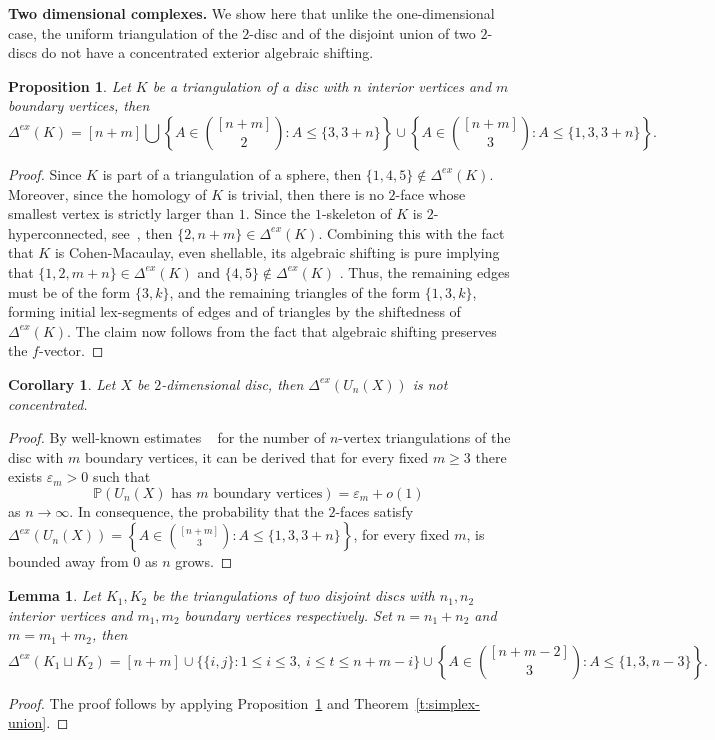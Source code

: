 \documentclass[reqno,english]{amsart}
\newtheorem{lemma}[theorem]{Lemma}
\newtheorem{proposition}[theorem]{Proposition}
\newtheorem{corollary}[theorem]{Corollary}
\numberwithin{claimcounter}{theorem}
\theoremstyle{remark}
\theoremstyle{definition}
\numberwithin{theorem}{section}
\renewcommand{\P}{\mathbb{P}}
\newcommand{\exshift}[1]{\Delta^{ex}(#1)}
\begin{document}
\noindent
{\bf Two dimensional complexes.}
We show here that unlike the one-dimensional case, the uniform triangulation of the $2$-disc and of the disjoint union of two $2$-discs do not have a concentrated exterior algebraic shifting.
\begin{proposition}
    \label{p:discshift}
    Let $K$ be a triangulation of a disc with $n$ interior vertices and $m$ boundary vertices, then $$\exshift{K} = [n+m] \bigcup \left \{A\in \binom{[n+m]}{2} \colon A \leq \{3,3+n\} \right \} \cup \left \{A \in \binom{[n+m]}{3} \colon A \leq \{1,3,3+n\} \right \} .$$
\end{proposition}
\begin{proof}
    Since $K$ is part of a triangulation of a sphere, then $\{1,4,5\} \notin \exshift{K}$. Moreover, since the homology of $K$ is trivial, then there is no $2$-face whose smallest vertex is strictly larger than $1$. Since the $1$-skeleton of $K$ is $2$-hyperconnected, see~\cite{kalai85-hyperconnectivity}, then $\{2,n+m\} \in \exshift{K}$. Combining this with the fact that $K$ is Cohen-Macaulay, even shellable, its algebraic shifting is pure implying that $\{1,2,m+n\}\in \exshift{K}$ and $\{4,5\}\notin \exshift{K}$ . Thus, the remaining edges must be of the form $\{3,k\}$, and the remaining triangles of the form $\{1,3,k\}$,    
    forming initial lex-segments of edges and of triangles by the shiftedness of $\exshift{K}$. The claim now follows from the fact that algebraic shifting preserves the $f$-vector.
\end{proof}

\begin{corollary}
    \label{c:discsconcentration}
    Let $X$ be $2$-dimensional disc, then $\exshift{U_n(X)}$ is not concentrated. 
\end{corollary}
\begin{proof}
    By well-known estimates ~\cite{Tutte1962,goulden2004combinatorial} for the number of $n$-vertex triangulations of the disc with $m$ boundary vertices, it can be derived that for every fixed $m\ge 3$ there exists $\varepsilon_m>0$ such that
    \[
    \P(U_n(X) \text{ has $m$ boundary vertices}) =\varepsilon_m +o(1)\,\]
    as $n\to \infty$. 
    In consequence, the probability that the $2$-faces satisfy $\exshift{U_n(X)} = \left \{A \in \binom{[n+m]}{3} \colon A \leq \{1,3,3+n\} \right \}$, for every fixed $m$, is bounded away from $0$ as $n$ grows.
\end{proof}

\begin{lemma}
    \label{c:twodiscshift}
    Let $K_1,K_2$ be the triangulations of two disjoint discs with $n_1,n_2$ interior vertices and $m_1,m_2$ boundary vertices respectively. Set $n=n_1+n_2$ and $m=m_1+m_2$, then
    $$\exshift{K_1\sqcup K_2} = [n+m] \cup \{\{i,j\}\colon 1\leq i\leq 3,~i \leq t\leq n+m-i\}\cup \left \{A\in \binom{[n+m-2]}{3}\colon A\leq \{1,3,n-3\} \right \}.$$
\end{lemma}
\begin{proof}
    The proof follows by applying Proposition~\ref{p:discshift} and Theorem~\ref{t:simplex-union}.
\end{proof}
\end{document}
